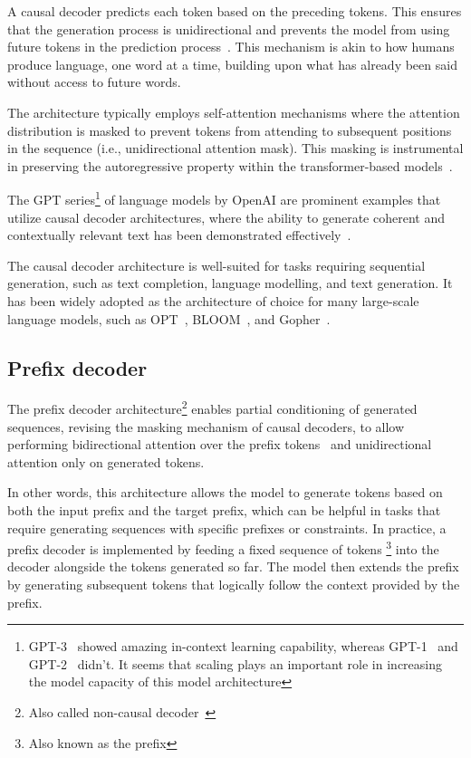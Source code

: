 A causal decoder predicts each token based on the preceding tokens.
This ensures that the generation process is unidirectional and prevents the model from using future tokens in the prediction process~\cite{vaswani2023attention}.
This mechanism is akin to how humans produce language, one word at a time, building upon what has already been said without access to future words.

The architecture typically employs self-attention mechanisms where the attention distribution is masked to prevent tokens from attending to subsequent positions in the sequence (i.e., unidirectional attention mask).
This masking is instrumental in preserving the autoregressive property within the transformer-based models~\cite{radford2019language}.

The GPT series\footnote{GPT-3~\cite{brown2020language} showed amazing in-context learning capability, whereas GPT-1~\cite{radford2018improving} and GPT-2~\cite{radford2019language} didn't. It seems that scaling plays an important role in increasing the model capacity of this model architecture} of language models by OpenAI are prominent examples that utilize causal decoder architectures, where the ability to generate coherent and contextually relevant text has been demonstrated effectively~\cite{brown2020language}.

The causal decoder architecture is well-suited for tasks requiring sequential generation, such as text completion, language modelling, and text generation.
It has been widely adopted as the architecture of choice for many large-scale language models, such as OPT~\cite{zhang2022opt}, BLOOM~\cite{workshop2023bloom}, and Gopher~\cite{rae2021scaling}.

\subsection{Prefix decoder}
\label{subsec:prefix-decoder}

The prefix decoder architecture\footnote{Also called non-causal decoder~\cite{zhang2022examining}} enables partial conditioning of generated sequences, revising the masking mechanism of causal decoders, to allow performing bidirectional attention over the prefix tokens~\cite{dong2019unified} and unidirectional attention only on generated tokens.

In other words, this architecture allows the model to generate tokens based on both the input prefix and the target prefix, which can be helpful in tasks that require generating sequences with specific prefixes or constraints.
In practice, a prefix decoder is implemented by feeding a fixed sequence of tokens \footnote{Also known as the prefix} into the decoder alongside the tokens generated so far.
The model then extends the prefix by generating subsequent tokens that logically follow the context provided by the prefix.

